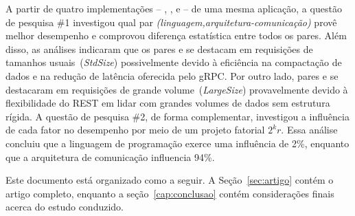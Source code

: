 A partir de quatro implementações -- \gogrpc{}, \gorest{}, \javagrpc{} e \javarest{} -- de uma
mesma aplicação, a questão de pesquisa \#1 investigou qual par {\em (linguagem,arquitetura-comunicação)} provê melhor desempenho e comprovou diferença estatística entre todos os pares. Além disso, as análises indicaram que os pares \gogrpc{} e \javagrpc{} se destacam em requisições de tamanhos usuais~({\em StdSize}) 
possivelmente devido à eficiência na compactação de dados e na redução de latência oferecida pelo gRPC.
Por outro lado, pares \gorest{} e \javarest{} se destacaram em requisições de grande volume~({\em LargeSize})
provavelmente devido à flexibilidade do REST em lidar com grandes volumes de dados sem estrutura rígida.
%
A questão de pesquisa \#2, de forma complementar, investigou a influência de cada fator no desempenho por meio de um projeto fatorial $2^kr$. Essa análise concluiu que a linguagem de programação exerce uma influência de 2\%, enquanto que
a arquitetura de comunicação influencia 94\%.   

Este documento está organizado como a seguir. A Seção~\ref{sec:artigo} contém o artigo completo, enquanto a seção~\ref{cap:conclusao} contém considerações finais acerca do estudo conduzido.
